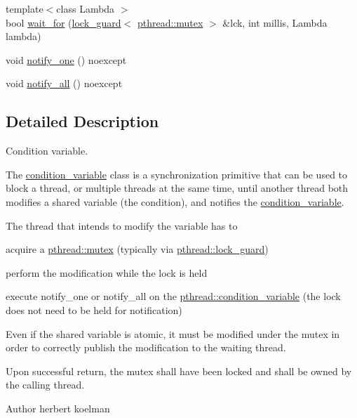 \begin{DoxyCompactItemize}
\item 
{\footnotesize template$<$class Lambda $>$ }\\bool \hyperlink{classpthread_1_1condition__variable_a5ee32edbf76592ec443e2544ecba811a}{wait\+\_\+for} (\hyperlink{classpthread_1_1lock__guard}{lock\+\_\+guard}$<$ \hyperlink{classpthread_1_1mutex}{pthread\+::mutex} $>$ \&lck, int millis, Lambda lambda)
\item 
void \hyperlink{classpthread_1_1condition__variable_ae374b1e852f36fc5eac93ad90d9fc85a}{notify\+\_\+one} () noexcept
\item 
void \hyperlink{classpthread_1_1condition__variable_ae40f0c9043ed693317bb9a07861efc65}{notify\+\_\+all} () noexcept
\end{DoxyCompactItemize}


\subsection{Detailed Description}
Condition variable.

The \hyperlink{classpthread_1_1condition__variable}{condition\+\_\+variable} class is a synchronization primitive that can be used to block a thread, or multiple threads at the same time, until another thread both modifies a shared variable (the condition), and notifies the \hyperlink{classpthread_1_1condition__variable}{condition\+\_\+variable}.

The thread that intends to modify the variable has to
\begin{DoxyItemize}
\item acquire a \hyperlink{classpthread_1_1mutex}{pthread\+::mutex} (typically via \hyperlink{classpthread_1_1lock__guard}{pthread\+::lock\+\_\+guard})
\item perform the modification while the lock is held
\item execute notify\+\_\+one or notify\+\_\+all on the \hyperlink{classpthread_1_1condition__variable}{pthread\+::condition\+\_\+variable} (the lock does not need to be held for notification)
\end{DoxyItemize}

Even if the shared variable is atomic, it must be modified under the mutex in order to correctly publish the modification to the waiting thread.

Upon successful return, the mutex shall have been locked and shall be owned by the calling thread.

\begin{DoxyAuthor}{Author}
herbert koelman 
\end{DoxyAuthor}


